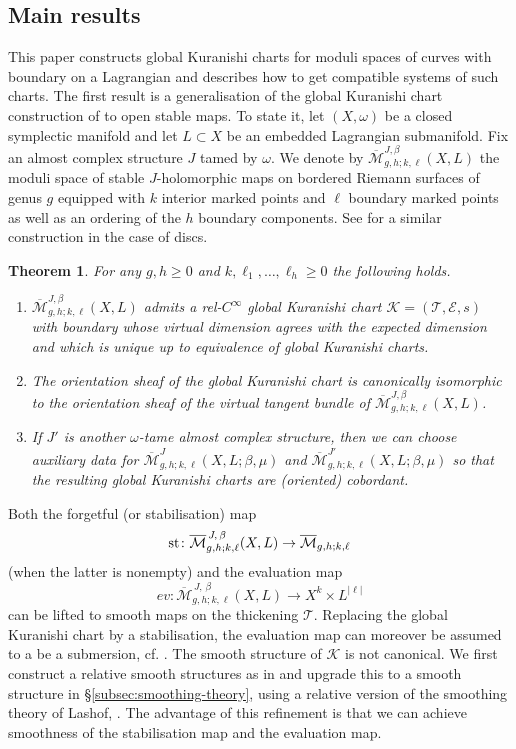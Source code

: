 \documentclass[11pt,psamsfonts, oneside, reqno]{amsart}
\newcommand{\cl}{\colon}
\newcommand{\eva}{ev}
\newcommand{\Mbar}{\overline{\mathcal M}}
\newcommand{\cE}{\mathcal{E}}
\newcommand{\cK}{\mathcal{K}}
\newcommand{\cT}{\mathcal{T}}
\newtheorem{intthm}{Theorem}
\newcommand{\stb}{\normalfont\text{st}}
\theoremstyle{definition}
\theoremstyle{remark}
\numberwithin{equation}{section}
\begin{document}
\subsection{Main results}
This paper constructs global Kuranishi charts for moduli spaces of curves with boundary on a Lagrangian and describes how to get compatible systems of such charts.
The first result is a generalisation of the global Kuranishi chart construction of \cite{HS22} to open stable maps. To state it, let $(X,\omega)$ be a closed symplectic manifold and let $L \subset X$ be an embedded Lagrangian submanifold. Fix an almost complex structure $J$ tamed by $\omega$.
We denote by $\Mbar_{g,h;k,\ell}^{J,\beta}(X,L)$ the moduli space of stable $J$-holomorphic maps on bordered Riemann surfaces of genus $g$ equipped with $k$ interior marked points and $\ell$ boundary marked points as well as an ordering of the $h$ boundary components. See \cite{Rab24} for a similar construction in the case of discs.

\begin{intthm}\label{thm:open-gw-global-chart} For any $g,h \geq 0$ and $k,\ell_1,\dots,\ell_h\geq 0$ the following holds.
	\begin{enumerate}[label=\alph*),leftmargin=20pt,ref=\alph*]
		\item\label{gkc-existence} $\Mbar^{J,\beta}_{g,h;k,\ell}(X,L)$ admits a rel-$C^\infty$ global Kuranishi chart $\cK = (\cT, \cE, s)$ with boundary whose virtual dimension agrees with the expected dimension and which is unique up to equivalence of global Kuranishi charts.
		\item\label{gkc-orientation} The orientation sheaf of the global Kuranishi chart is canonically isomorphic to the orientation sheaf of the virtual tangent bundle of $\Mbar^{J,\beta}_{g,h;k,\ell}(X,L)$.
		\item\label{gkc-cobordant} If $J'$ is another $\omega$-tame almost complex structure, then we can choose auxiliary data for $\Mbar^J_{g,h;k,\ell}(X,L;\beta,\mu)$ and $\Mbar^{J'}_{g,h;k,\ell}(X,L;\beta,\mu)$ so that the resulting global Kuranishi charts are (oriented) cobordant.
	\end{enumerate}
\end{intthm}

\noindent
Both the forgetful (or stabilisation) map 
\[\stb \cl \Mbar^{\,J,\,\beta}_{g,h;k,\ell}(X,L)\to \Mbar_{g,h;k,\ell}\]
(when the latter is nonempty) and the evaluation map 
\[\eva \cl \Mbar^{\,J,\,\beta}_{g,h;k,\ell}(X,L)\to X^k\times L^{|\ell|}\]
can be lifted to smooth maps on the thickening $\cT$. Replacing the global Kuranishi chart by a stabilisation, the evaluation map can moreover be assumed to a be a submersion, cf. \cite{AMS21}. The smooth structure of $\cK$ is not canonical. We first construct a relative smooth structures as in \cite{HS22} and upgrade this to a smooth structure in \S\ref{subsec:smoothing-theory}, using a relative version of the smoothing theory of Lashof, \cite{Las79}. The advantage of this refinement is that we can achieve smoothness of the stabilisation map and the evaluation map.\\
\end{document}
